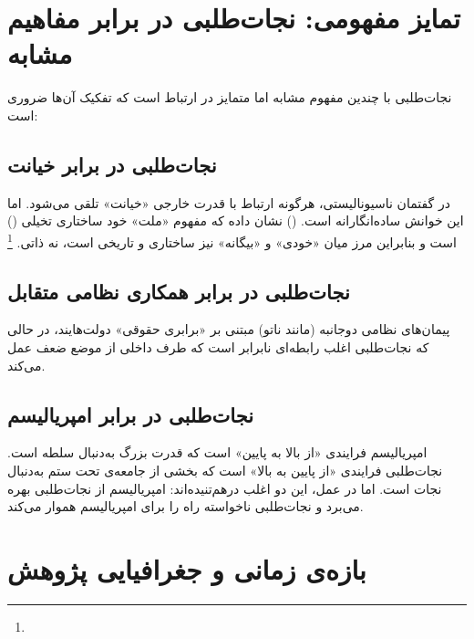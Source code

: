 \section{تمایز مفهومی: نجات‌طلبی در برابر مفاهیم مشابه}
\label{sec:ch01-distinctions}

نجات‌طلبی با چندین مفهوم مشابه اما متمایز در ارتباط است که تفکیک آن‌ها ضروری است:

\subsection{نجات‌طلبی در برابر خیانت}

در گفتمان ناسیونالیستی، هرگونه ارتباط با قدرت خارجی «خیانت» تلقی می‌شود. اما این خوانش ساده‌انگارانه است.  () نشان داده که مفهوم «ملت» خود ساختاری تخیلی () است و بنابراین مرز میان «خودی» و «بیگانه» نیز ساختاری و تاریخی است، نه ذاتی.%
\footnote{}

\subsection{نجات‌طلبی در برابر همکاری نظامی متقابل}

پیمان‌های نظامی دوجانبه (مانند ناتو) مبتنی بر «برابری حقوقی» دولت‌هایند، در حالی که نجات‌طلبی اغلب رابطه‌ای نابرابر است که طرف داخلی از موضع ضعف عمل می‌کند.

\subsection{نجات‌طلبی در برابر امپریالیسم}

\begin{tcolorbox}[defbox, title={تمایز ظریف}]
امپریالیسم فرایندی «از بالا به پایین» است که قدرت بزرگ به‌دنبال سلطه است. نجات‌طلبی فرایندی «از پایین به بالا» است که بخشی از جامعه‌ی تحت ستم به‌دنبال نجات است. اما در عمل، این دو اغلب درهم‌تنیده‌اند: امپریالیسم از نجات‌طلبی بهره می‌برد و نجات‌طلبی ناخواسته راه را برای امپریالیسم هموار می‌کند.
\end{tcolorbox}

\section{بازه‌ی زمانی و جغرافیایی پژوهش}
\label{sec:ch01-scope}

